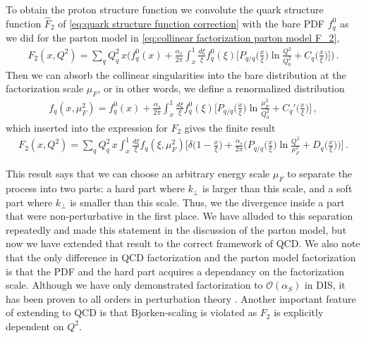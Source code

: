 \medskip
To obtain the proton structure function we convolute the quark structure function $\hat{F}_{2}$ of \cref{eq:quark structure function correction} with the bare PDF $f_{q}^{0}$ as we did for the parton model in \cref{eq:collinear factorization parton model F_2}, 
\begin{align}
    F_{2}(x,Q^{2})=\sum_{q}Q_{q}^{2}\,x\Big(f_{q}^{0}(x)+\frac{\alpha_s}{2\pi}\int_{x}^{1}\frac{d\xi}{\xi}f_{q}^{0}(\xi)\big[P_{q/q}\big(\frac{x}{\xi}\big)\ln{\frac{Q^{2}}{Q_{0}^{2}}}+C_{q}\big(\frac{x}{\xi}\big)\big]\Big)\,.
\end{align}
Then we can absorb the collinear singularities into the bare distribution at the factorization scale $\mu_F$, or in other words, we define a renormalized distribution
\begin{align}
    f_{q}(x,\mu_{F}^{2})=f_{q}^{0}(x)+\frac{\alpha_s}{2\pi}\int_{x}^{1}\frac{d\xi}{\xi}f_{q}^{0}(\xi)\big[P_{q/q}\big(\frac{x}{\xi}\big)\ln{\frac{\mu_{F}^{2}}{Q_{0}^{2}}}+C_{q}'\big(\frac{x}{\xi}\big)\big]\,,
\end{align}
which inserted into the expression for $F_{2}$ gives the finite result
\begin{align}\label{eq:renormalized F_2}
    F_{2}(x,Q^{2})=\sum_{q}Q_{q}^{2}\,x\int_{x}^{1}\frac{d\xi}{\xi}f_{q}(\xi,\mu_{F}^{2})\big[\delta\big(1-\frac{x}{\xi}\big)+\frac{\alpha_s}{2\pi}\Big(P_{q/q}\big(\frac{x}{\xi}\big)\ln{\frac{Q^{2}}{\mu_{F}^{2}}}+D_{q}\big(\frac{x}{\xi}\big)\Big)\big]\,.
\end{align}

This result says that we can choose an arbitrary energy scale $\mu_F$ to separate the process into two parts: a hard part where $k_{\perp}$ is larger than this scale, and a soft part where $k_{\perp}$ is smaller than this scale. Thus, we  the divergence inside a part that were non-perturbative in the first place. We have alluded to this separation repeatedly and made this statement in the discussion of the parton model, but now we have extended that result to the correct framework of QCD. We also note that the only difference in QCD factorization and the parton model factorization is that the PDF and the hard part acquires a dependancy on the factorization scale. Although we have only demonstrated factorization to $\mathcal{O}(\alpha_S)$ in DIS, it has been proven to all orders in perturbation theory \cite{Collins:1989gx}. Another important feature of extending to QCD is that Bjorken-scaling is violated as $F_{2}$ is explicitly dependent on $Q^{2}$.


